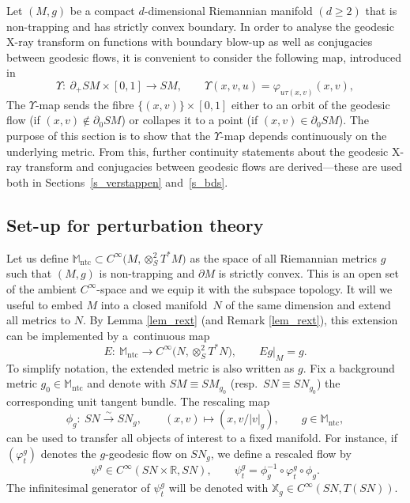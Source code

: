 \documentclass[10pt,a4paper]{amsart}
\numberwithin{equation}{section}
\theoremstyle{definition}
\newcommand{\R}{\mathbb{R}} %
\newcommand{\M}{\mathbb{M}}
\newcommand{\1}{{\bf 1}}
\newcommand{\ntc}{\mathrm{ntc}}
\begin{document}
Let $(M,g)$ be a compact $d$-dimensional Riemannian manifold $(d\ge 2)$ that is non-trapping and has strictly convex boundary. In order to analyse the geodesic X-ray transform on functions with boundary blow-up as well as conjugacies between geodesic flows, it is convenient to consider the following map, introduced in \cite{MNP20}
\[
	\Upsilon\colon\ \partial_+SM\times [0,1]\rightarrow SM,\qquad \Upsilon(x,v,u)=\varphi_{u\tau(x,v)}(x,v),
\]
The $\Upsilon$-map sends the fibre $\{(x,v)\}\times [0,1]$ either to an orbit of the geodesic flow (if $(x,v)\notin \partial_0SM$) or collapes it to a point (if $(x,v) \in \partial_0SM$).
The purpose of this section is to show that the $\Upsilon$-map depends continuously on the underlying metric. From this, further continuity statements about the geodesic X-ray transform and conjugacies between geodesic flows are derived---these are used both in Sections~\ref{s_verstappen} and~\ref{s_bds}.


\subsection{Set-up for perturbation theory}
Let us define
$\mathbb M_\ntc \subset C^\infty\bigl(M,\otimes_S^2T^*M\bigr)
$ as the space of all Riemannian metrics $g$ such that $(M,g)$ is non-trapping and $\partial M$ is strictly convex. This is an open set of the ambient $C^\infty$-space and we equip it with the subspace topology. It will we useful to embed $M$ into a closed manifold~$N$ of the same dimension and extend all metrics to $N$. By Lemma \ref{lem_rext} (and Remark \ref{lem_rext}), this extension can be implemented by a~continuous map
\begin{equation}\label{extensionE}
 E\colon\ \mathbb M_\ntc \rightarrow C^\infty\bigl(N,\otimes^2_S T^*N\bigr), \qquad Eg\vert_{M}=g.
\end{equation}
To simplify notation, the extended metric is also written as $g$.
Fix a background metric $g_0\in \M_\ntc$ and denote with $SM\equiv SM_{g_0}$ (resp.~$SN\equiv SN_{g_0}$) the corresponding unit tangent bundle.
The rescaling map
\[
	\phi_g\colon\ SN\xrightarrow{\sim} SN_g,\qquad (x,v)\mapsto (x,v/|v|_g),\qquad g\in \M_\ntc,
\]
can be used to transfer all objects of interest to a fixed manifold.
For instance, if $(\varphi^g_t)$ denotes the $g$-geodesic flow on $SN_g$, we define a rescaled flow by
\begin{equation*}
\psi^g\in C^\infty(SN\times \R,SN),\qquad \psi_t^g=\phi_g^{-1}\circ \varphi_t^g\circ \phi_g.
\end{equation*}
The infinitesimal generator of $\psi^g_t$ will be denoted with $\mathbb X_g \in C^\infty(SN,T(SN))$.
\end{document}
